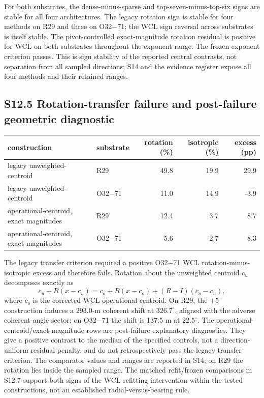 \documentclass[journal,onecolumn,10pt]{IEEEtran}
\begin{document}
For both substrates, the dense-minus-sparse and top-seven-minus-top-six signs are stable for all four architectures. The legacy rotation sign is stable for four methods on R29 and three on O32$-$71; the WCL sign reversal across substrates is itself stable. The pivot-controlled exact-magnitude rotation residual is positive for WCL on both substrates throughout the exponent range. The frozen exponent criterion passes. This is sign stability of the reported central contrasts, not separation from all sampled directions; S14 and the evidence register expose all four methods and their retained ranges.

\subsection*{S12.5 Rotation-transfer failure and post-failure geometric diagnostic}

\begin{center}\begin{minipage}{\textwidth}\centering
{}

\begin{tabular}{@{}llrrr@{}}
\toprule
construction & substrate & rotation (\%) & isotropic (\%) & excess (pp) \\
\midrule

legacy unweighted-centroid & R29 & 49.8 & 19.9 & 29.9 \\
legacy unweighted-centroid & O32$-$71 & 11.0 & 14.9 & -3.9 \\
operational-centroid, exact magnitudes & R29 & 12.4 & 3.7 & 8.7 \\
operational-centroid, exact magnitudes & O32$-$71 & 5.6 & -2.7 & 8.3 \\
\bottomrule
\end{tabular}
\end{minipage}\end{center}

The legacy transfer criterion required a positive O32$-$71 WCL rotation-minus-isotropic excess and therefore fails. Rotation about the unweighted centroid $c_u$ decomposes exactly as
\begin{equation}\label{eq:s-display-1}
c_u+R(x-c_u)=c_o+R(x-c_o)+(R-I)(c_o-c_u),
\end{equation}
where $c_o$ is the corrected-WCL operational centroid. On R29, the $+5^{\circ}$ construction induces a 293.0-m coherent shift at $326.7^{\circ}$, aligned with the adverse coherent-angle sector; on O32$-$71 the shift is 137.5 m at $22.5^{\circ}$. The operational-centroid/exact-magnitude rows are post-failure explanatory diagnostics. They give a positive contrast to the median of the specified controls, not a direction-uniform residual penalty, and do not retrospectively pass the legacy transfer criterion. The comparator values and ranges are reported in S14; on R29 the rotation lies inside the sampled range. The matched refit/frozen comparisons in S12.7 support both signs of the WCL refitting intervention within the tested constructions, not an established radial-versus-bearing rule.
\end{document}

